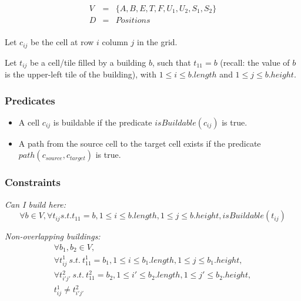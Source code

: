 \documentclass[11pt]{article}
\begin{document}
\begin{displaymath}
  \begin{array}{ccc}
    V & = & \{A, B, E, T, F, U_1, U_2, S_1, S_2\}\\
    D & = & Positions\\
  \end{array}
\end{displaymath}

Let $c_{ij}$ be the cell at row $i$ column $j$ in the grid.

Let  $t_{ij}$ be  a  cell/tile filled  by  a building  $b$, such  that
$t_{11} = b$  (recall: the value of $b$ is the  upper-left tile of the
building), with $1 \leq i \leq b.length$ and $1 \leq j \leq b.height$.


\subsubsection{Predicates}

\begin{itemize}
\item A cell $c_{ij}$ is buildable if the predicate {\bf $isBuildable(c_{ij})$} is
  true.
\item A  path from the  source cell to  the target cell exists  if the
  predicate {\bf $path(c_{source}, c_{target})$} is true.
\end{itemize}

\subsubsection{Constraints}

{\em Can I build here:}
\begin{displaymath}
  \forall  b \in V,  \forall t_{ij}  s.t. t_{11}  = b,  1 \leq  i \leq
  b.length, 1 \leq j \leq b.height, isBuildable(t_{ij})
\end{displaymath}

\noindent
{\em Non-overlapping buildings:}
\begin{displaymath}
  \begin{array}{l}
    \forall b_1, b_2 \in V,\\
    \forall t^1_{ij}\  s.t.\ t^1_{11} = b_1,  1 \leq i  \leq b_1.length, 1
    \leq j \leq b_1.height,\\
    \forall t^2_{i'j'}\ s.t.\ t^2_{11} = b_2, 1 \leq i' \leq b_2.length, 1
    \leq j' \leq b_2.height,\\
    t^1_{ij} \neq t^2_{i'j'}
  \end{array}
\end{displaymath}
\end{document}
